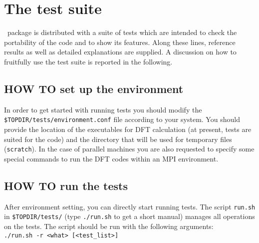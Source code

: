 
\thispagestyle{empty}
\section{The test suite}
\label{section:test}
%
\WANT\ package is distributed with a suite of tests which are
intended to check the portability of the code and to show its
features. Along these lines, reference results as well as detailed
explanations are supplied.  A discussion on how to fruitfully use
the test suite is reported in the following.

\subsection*{HOW TO set up the environment}
     In order to get started with running tests you should modify the
     {\tt \$TOPDIR/tests/environment.conf} file according to your system.
     You should provide the location of the executables for DFT calculation
     (at present, tests are suited for the \PWSCF code) and the directory
     that will be used for temporary files ({\tt scratch}).
     In the case of parallel machines you are also requested to
     specify some special commands to run the DFT codes within an
     MPI environment.

\subsection*{HOW TO run the tests}
     After environment setting, you can directly start running tests. The
     script {\tt run.sh} in {\tt \$TOPDIR/tests/} (type {\tt ./run.sh} to get a
     short manual) manages all operations on the tests.
     The script should be run with the following arguments: \\

     {\tt  ./run.sh -r <what>  [<test\_list>] } \\

